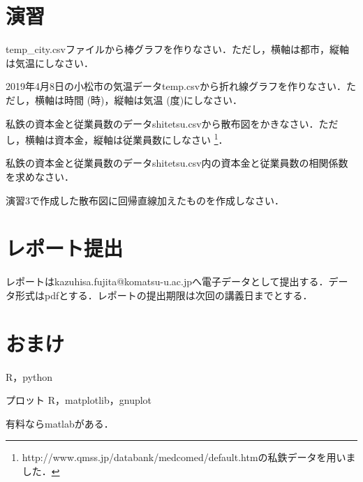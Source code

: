 \section{演習}

\practice
temp\_city.csvファイルから棒グラフを作りなさい．ただし，横軸は都市，縦軸は気温にしなさい．

\practice
2019年4月8日の小松市の気温データtemp.csvから折れ線グラフを作りなさい．ただし，横軸は時間 (時)，縦軸は気温 (度)にしなさい．

\practice
私鉄の資本金と従業員数のデータshitetsu.csvから散布図をかきなさい．ただし，横軸は資本金，縦軸は従業員数にしなさい
\footnote{http://www.qmss.jp/databank/medcomed/default.htmの私鉄データを用いました．}．

\practice
私鉄の資本金と従業員数のデータshitetsu.csv内の資本金と従業員数の相関係数を求めなさい．

\practice
演習3で作成した散布図に回帰直線加えたものを作成しなさい．

\section{レポート提出}

レポートはkazuhisa.fujita@komatsu-u.ac.jpへ電子データとして提出する．データ形式はpdfとする．レポートの提出期限は次回の講義日までとする．

\section{おまけ}

R，python

プロット
R，matplotlib，gnuplot


有料ならmatlabがある．
